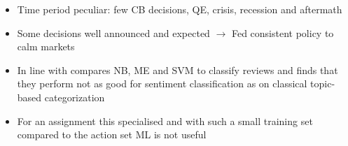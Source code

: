 
\begin{itemize}
	\item Time period peculiar: few CB decisions, QE, crisis, recession and aftermath
	\item Some decisions well announced and expected $\rightarrow$ Fed consistent policy to calm markets
	\item In line with \textcite{Pang.2002} compares NB, ME and SVM to classify reviews and finds that they perform not as good for sentiment classification as on classical topic-based categorization
	\item For an assignment this specialised and with such a small training set compared to the action set ML is not useful
\end{itemize}